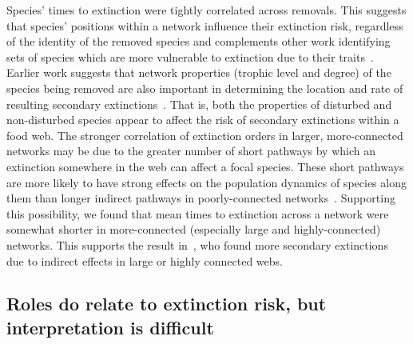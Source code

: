 \documentclass[12pt]{article}
\begin{document}
		Species' times to extinction were tightly correlated across removals. 
		This suggests that species' positions within a network influence their extinction risk, regardless of the identity of the removed species and complements other work identifying sets of species which are more vulnerable to extinction due to their traits~\citep{Curtsdotter2011,Ryser2019}. 
		Earlier work suggests that network properties (trophic level and degree) of the species being removed are also important in determining the location and rate of resulting secondary extinctions~\citep{Wootton2016a,Dunne2002}.
		That is, both the properties of disturbed and non-disturbed species appear to affect the risk of secondary extinctions within a food web.
		The stronger correlation of extinction orders in larger, more-connected networks may be due to the greater number of short pathways by which an extinction somewhere in the web can affect a focal species. 
		These short pathways are more likely to have strong effects on the population dynamics of species along them than longer indirect pathways in poorly-connected networks~\citep{Jordan2002,Jordan2006}.
		Supporting this possibility, we found that mean times to extinction across a network were somewhat shorter in more-connected (especially large and highly-connected) networks.
		This supports the result in~\citet{Wootton2016a}, who found more secondary extinctions due to indirect effects in large or highly connected webs. 


	\subsection*{Roles do relate to extinction risk, but interpretation is difficult}
\end{document}
